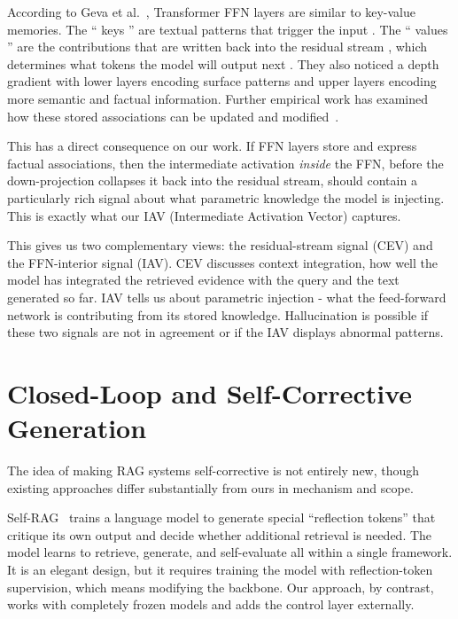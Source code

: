 According to Geva et al.~\cite{geva2021ffn}, Transformer FFN layers are similar to key-value memories. The “ keys ” are textual patterns that trigger the input . The “ values ” are the contributions that are written back into the residual stream , which determines what tokens the model will output next . They also noticed a depth gradient with lower layers encoding surface patterns and upper layers encoding more semantic and factual information. Further empirical work has examined how these stored associations can be updated and modified~\cite{qiu2024updating}.

This has a direct consequence on our work. If FFN layers store and express factual associations, then the intermediate activation \emph{inside} the FFN, before the down-projection collapses it back into the residual stream, should contain a particularly rich signal about what parametric knowledge the model is injecting. This is exactly what our IAV (Intermediate Activation Vector) captures.

This gives us two complementary views: the residual-stream signal (CEV) and the FFN-interior signal (IAV). CEV discusses context integration, how well the model has integrated the retrieved evidence with the query and the text generated so far. IAV tells us about parametric injection - what the feed-forward network is contributing from its stored knowledge. Hallucination is possible if these two signals are not in agreement or if the IAV displays abnormal patterns.

\section{Closed-Loop and Self-Corrective Generation}
\label{sec:lit_closedloop}

The idea of making RAG systems self-corrective is not entirely new, though existing approaches differ substantially from ours in mechanism and scope.

Self-RAG~\cite{asai2024selfrag} trains a language model to generate special ``reflection tokens'' that critique its own output and decide whether additional retrieval is needed. The model learns to retrieve, generate, and self-evaluate all within a single framework. It is an elegant design, but it requires training the model with reflection-token supervision, which means modifying the backbone. Our approach, by contrast, works with completely frozen models and adds the control layer externally.


